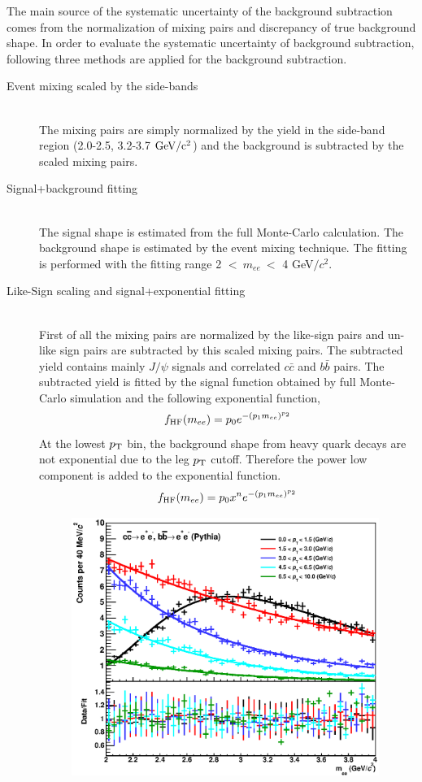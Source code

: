 {The main source of the systematic uncertainty of the background subtraction comes from the normalization of mixing pairs and discrepancy of true background shape. 
In order to evaluate the systematic uncertainty of background subtraction, following three methods are applied for the background subtraction. 
\begin{description}
\item[Event mixing scaled by the side-bands]\mbox{}\\
  The mixing pairs are simply normalized by the yield in the side-band region (2.0-2.5, 3.2-3.7 $\rm{GeV}/c^{2}$) and the background is subtracted by the scaled mixing pairs.   
\item[Signal+background fitting]\mbox{}\\
  The signal shape is estimated from the full Monte-Carlo calculation. 
  The background shape is estimated by the event mixing technique. 
  The fitting is performed with the fitting  range 2 $< ~m_{ee}~<$ 4 GeV$/c^{2}$.  
\item[Like-Sign scaling and signal+exponential fitting]\mbox{}\\
  First of all the mixing pairs are normalized by the like-sign pairs and un-like sign pairs are subtracted by this scaled mixing pairs. 
  The subtracted yield contains mainly $J/\psi$ signals and correlated $c\bar{c}$ and $b\bar{b}$ pairs.
  The subtracted yield is fitted by the signal function obtained by full Monte-Carlo simulation and the following exponential function, 
  \begin{equation}
    f_{\rm{HF}}(m_{ee}) = p_{0} e^{-(p_{1}m_{ee})^{p_{2}}}
  \end{equation}
  At the lowest $p_{\rm{T}}$ bin,  the background shape from heavy quark decays are not exponential due to the leg $p_{\rm{T}}$ cutoff. 
  Therefore the power low component is added to the exponential function. 
  \begin{equation}
    f_{\rm{HF}}(m_{ee}) = p_{0} x^{n}e^{-(p_{1}m_{ee})^{p_{2}}}
  \end{equation}
  \begin{figure}[!h]
   \begin{center}
        \includegraphics[width=10cm]{chap4/figure/RawYield/PythiawExpFit.eps}

\end{center}
\end{figure}
\end{description}}
